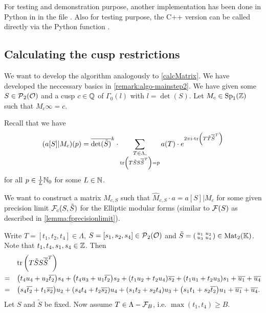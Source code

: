 For testing and demonstration purpose, another implementation has been done in Python in  in the file . Also for testing purpose, the C++ version can be called directly via the Python function .

\subsection{Calculating the cusp restrictions}
\label{calcMatrixTrans}
We want to develop the algorithm analogously to \cref{calcMatrix}. We have developed the neccessary basics in \cref{remark:algo-mainstep2}. We have given some $S \in \operatorname{\mathcal{P}}_2(\mathcal{O})$ and a cusp $c \in \mathbb{Q}$ of $\Gamma_0(l)$ with $l = \det(S)$. Let $M_c \in \operatorname{Sp}_1(\mathbb{Z})$ such that $M_c \infty = c$.

Recall that we have
\[ (a[S]| M_c) (p) = \overline{\det(\tilde{S})}^k \cdot \sum_{\begin{subarray}{c}
T \in \Lambda,\\
\textup{\textrm{tr}}\left(T \tilde{S} S \overline{\tilde{S}}^T\right) = p
\end{subarray}} a(T) \cdot e^{2 \pi i \cdot \textup{\textrm{tr}}\left(T \tilde{T} \overline{\tilde{S}}^T\right)} \]
for all $p \in \frac{1}{L} \mathbb{N}_0$ for some $L \in \mathbb{N}$.

We want to construct a matrix $\hat{M}_{c,S}$ such that $\hat{M}_{c,S} \cdot a = a[S]|M_c$ for some given precision limit $\mathcal{F}_c(S, \tilde{S})$ for the Elliptic modular forms (similar to $\mathcal{F}(S)$ as described in \cref{lemma:fprecisionlimit}).

Write $T = [t_1,t_2,t_4] \in \Lambda$, $S = [s_1,s_2,s_4] \in \operatorname{\mathcal{P}}_2(\mathcal{O})$ and $\tilde{S} = \left( \begin{smallmatrix} u_1 & u_2 \\ u_3 & u_4 \end{smallmatrix} \right) \in \operatorname{Mat}_2(\mathbb{K})$.  Note that $t_1,t_4,s_1,s_4 \in \mathbb{Z}$. Then
\begin{align*}
& \textup{\textrm{tr}}\left(T \tilde{S} S \overline{\tilde{S}}^T\right) \\
=\quad & {\left(t_{4} u_{4} + u_{2} \overline{t_{2}}\right)} s_{4} + {\left(t_{4} u_{3} + u_{1} \overline{t_{2}}\right)} s_{2} + {\left(t_{1} u_{2} + t_{2} u_{4}\right)} \overline{s_{2}} + {\left(t_{1} u_{1} + t_{2} u_{3}\right)} s_{1} + \overline{u_{1}} + \overline{u_{4}} \\
=\quad & {\left(s_{4} \overline{t_{2}} + t_{1} \overline{s_{2}}\right)} u_{2} + {\left(s_{4} t_{4} + t_{2} \overline{s_{2}}\right)} u_{4} + {\left(s_{1} t_{2} + s_{2} t_{4}\right)} u_{3} + {\left(s_{1} t_{1} + s_{2} \overline{t_{2}}\right)} u_{1} + \overline{u_{1}} + \overline{u_{4}} .
\end{align*}
Let $S$ and $\tilde{S}$ be fixed. Now assume $T \in \Lambda - \mathcal{F}_B$, i.e. $\max(t_1,t_4) \ge B$.

